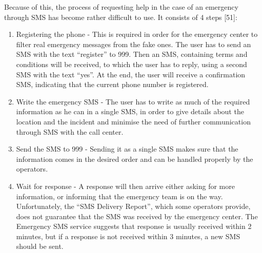\documentclass{article}
\begin{document}
Because of this, the process of requesting help in the case of an emergency through SMS has become rather difficult to use. It consists of 4 steps [51]:
\begin{enumerate}
\item Registering the phone - This is required in order for the emergency center to filter real emergency messages from the fake ones. The user has to send an SMS with the text “register” to 999. Then an SMS, containing terms and conditions will be received, to which the user has to reply, using a second SMS with the text “yes”. At the end, the user will receive a confirmation SMS, indicating that the current phone number is registered.
\item Write the emergency SMS - The user has to write as much of the required information as he can in a single SMS, in order to give details about the location and the incident and minimise the need of further communication through SMS with the call center.
\item Send the SMS to 999 - Sending it as a single SMS makes sure that the information comes in the desired order and can be handled properly by the operators.
\item Wait for response - A response will then arrive either asking for more information, or informing that the emergency team is on the way. Unfortunately, the “SMS Delivery Report”, which some operators provide, does not guarantee that the SMS was received by the emergency center. The Emergency SMS service suggests that response is usually received within 2 minutes, but if a response is not received within 3 minutes, a new SMS should be sent.
\end{enumerate}
\end{document}
